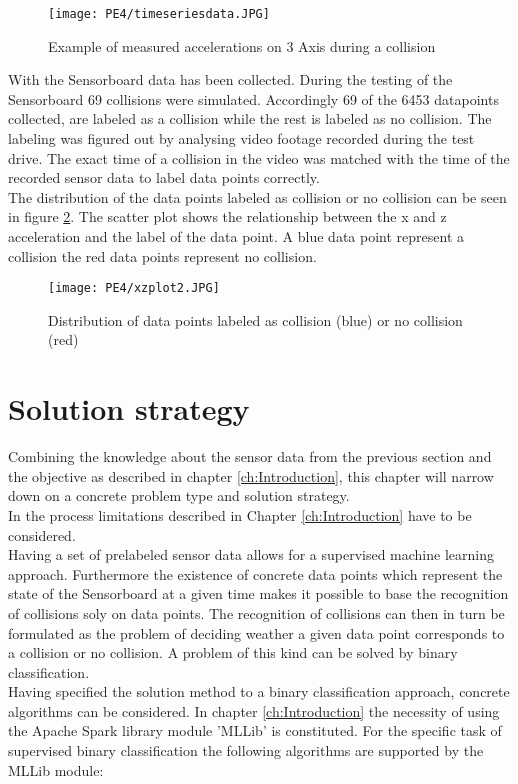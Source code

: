\begin{figure}[h]
\centering
\texttt{[image: PE4/timeseriesdata.JPG]}
\caption{Example of measured accelerations on 3 Axis during a collision }
\label{fig:timeaxis}
\end{figure}

With the Sensorboard data has been collected. During the testing of the Sensorboard 69 collisions were simulated. Accordingly 69 of the 6453 datapoints collected,  are labeled as a collision while the rest is labeled  as no collision. The labeling was figured out by analysing video footage recorded during the test drive. The exact time of a collision in the video was matched with the time of the recorded sensor data to label data points correctly.\\
The distribution of the data points labeled as collision or no collision can be seen in figure \ref{fig:xyscatter}. The scatter plot shows the relationship between the x and z acceleration and the label of the data point. A blue data point represent a collision the red data points represent no collision.

\begin{figure}[h]
\centering
\texttt{[image: PE4/xzplot2.JPG]}
\caption{Distribution of data points labeled as collision (blue) or no collision (red)}
\label{fig:xyscatter}
\end{figure}

\section{Solution strategy}
\label{sec:Solution strategy}
Combining the knowledge about the sensor data from the previous section and the objective as described in chapter \ref{ch:Introduction}, this chapter will narrow down on a concrete problem type and solution strategy.\\
In the process limitations described in Chapter \ref{ch:Introduction} have to be considered. \\ 
Having a set of prelabeled sensor data allows for a supervised machine learning approach.  Furthermore the existence of concrete data points which represent the state of the Sensorboard at a given time makes it possible to base the recognition of collisions soly on data points. The recognition of collisions can then in turn be formulated as the problem of deciding weather a given data point corresponds to a collision or no collision. A problem of this kind can be solved by binary classification. \\
Having specified the solution method to a binary classification approach, concrete algorithms can be considered. In chapter \ref{ch:Introduction}  the necessity of using the Apache Spark library module 'MLLib' is constituted. For the specific task of supervised binary classification the following algorithms are supported by the MLLib module:

